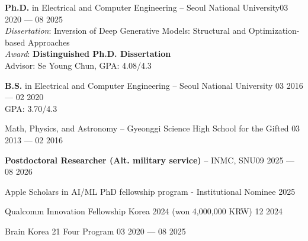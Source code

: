 \begin{cvcontent}
\textbf{Ph.D.} in Electrical and Computer Engineering -- {Seoul National University}\hfill {03 2020 --- 08 2025}\\
\textit{Dissertation}: Inversion of Deep Generative Models: Structural and Optimization-based Approaches\\
\textit{Award}: \textbf{Distinguished Ph.D. Dissertation}\\
Advisor: Se Young Chun, GPA: 4.08/4.3

\textbf{B.S.} in Electrical and Computer Engineering -- {Seoul National University}  \hfill {03 2016 --- 02 2020}\\
GPA: 3.70/4.3

Math, Physics, and Astronomy -- {Gyeonggi Science High School for the Gifted} \hfill {03 2013 --- 02 2016}

\end{cvcontent}
\begin{cvcontent}
\textbf{Postdoctoral Researcher (Alt. military service)} -- {INMC, SNU}\hfill {09 2025 --- 08 2026}

\end{cvcontent}
\begin{cvcontent}
Apple Scholars in AI/ML PhD fellowship program - Institutional Nominee \hfill 2025

Qualcomm Innovation Fellowship Korea 2024 (won 4,000,000 KRW) \hfill 12 2024

Brain Korea 21 Four Program \hfill 03 2020 --- 08 2025\\

\end{cvcontent}
